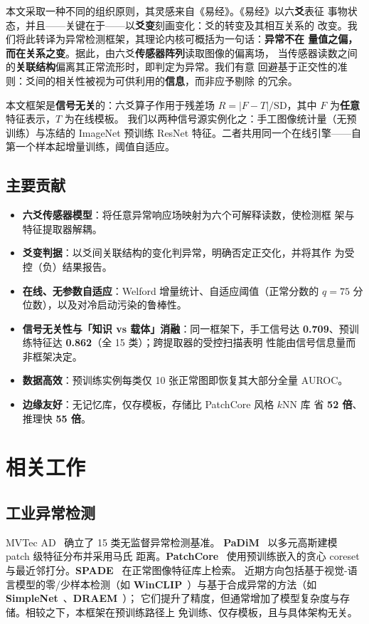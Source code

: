 \documentclass[journal,10pt]{IEEEtran}
\begin{document}
本文采取一种不同的组织原则，其灵感来自《易经》。《易经》以六\textbf{爻}表征
事物状态，并且——关键在于——以\textbf{爻变}刻画变化：爻的转变及其相互关系的
改变。我们将此转译为异常检测框架，其理论内核可概括为一句话：\textbf{异常不在
量值之偏，而在关系之变}。据此，由六爻\textbf{传感器阵列}读取图像的偏离场，
当传感器读数之间的\textbf{关联结构}偏离其正常流形时，即判定为异常。我们有意
回避基于正交性的准则：爻间的相关性被视为可供利用的\textbf{信息}，而非应予剔除
的冗余。

本文框架是\textbf{信号无关}的：六爻算子作用于残差场
$R = |F - T| / \mathrm{SD}$，其中 $F$ 为\textbf{任意}特征表示，$T$ 为在线模板。
我们以两种信号源实例化之：手工图像统计量（无预训练）与冻结的 ImageNet 预训练
ResNet 特征。二者共用同一个在线引擎——自第一个样本起增量训练，阈值自适应。

\subsection{主要贡献}
\begin{itemize}
\item \textbf{六爻传感器模型}：将任意异常响应场映射为六个可解释读数，使检测框
架与特征提取器解耦。
\item \textbf{爻变判据}：以爻间关联结构的变化判异常，明确否定正交化，并将其作
为受控（负）结果报告。
\item \textbf{在线、无参数自适应}：Welford 增量统计、自适应阈值（正常分数的
$q{=}75$ 分位数），以及对冷启动污染的鲁棒性。
\item \textbf{信号无关性与「知识 vs 载体」消融}：同一框架下，手工信号达
\textbf{0.709}、预训练特征达 \textbf{0.862}（全 15 类）；跨提取器的受控扫描表明
性能由信号信息量而非框架决定。
\item \textbf{数据高效}：预训练实例每类仅 10 张正常图即恢复其大部分全量 AUROC。
\item \textbf{边缘友好}：无记忆库，仅存模板，存储比 PatchCore 风格 $k$NN 库
省 \textbf{52 倍}、推理快 \textbf{55 倍}。
\end{itemize}

\section{相关工作}
\subsection{工业异常检测}
MVTec AD~\cite{bergmann2019mvtec} 确立了 15 类无监督异常检测基准。
\textbf{PaDiM}~\cite{defard2021padim} 以多元高斯建模 patch 级特征分布并采用马氏
距离。\textbf{PatchCore}~\cite{roth2022patchcore} 使用预训练嵌入的贪心 coreset
与最近邻打分。\textbf{SPADE}~\cite{cohen2021spade} 在正常图像特征库上检索。
近期方向包括基于视觉-语言模型的零/少样本检测（如
\textbf{WinCLIP}~\cite{jeong2023winclip}）与基于合成异常的方法（如
\textbf{SimpleNet}~\cite{liu2023simplenet}、\textbf{DRAEM}~\cite{zavrtanik2021draem}）；
它们提升了精度，但通常增加了模型复杂度与存储。相较之下，本框架在预训练路径上
免训练、仅存模板，且与具体架构无关。
\end{document}
